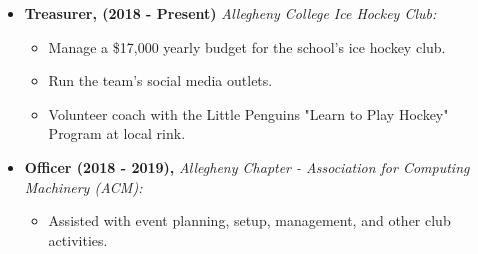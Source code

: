 \documentclass[11pt,a4paper,sans]{moderncv}
\begin{document}
\begin{itemize} %
\item \textbf{Treasurer, (2018 - Present)} \textit{Allegheny College Ice Hockey Club:}
\begin{itemize} %
  \item Manage a \$17,000 yearly budget for the school's ice hockey club.
  \item Run the team's social media outlets.
  \item Volunteer coach with the Little Penguins "Learn to Play Hockey" Program at local rink.
\end{itemize} %

\vspace{2pt}

\item \textbf{Officer (2018 - 2019),} \textit{Allegheny Chapter - Association for Computing Machinery (ACM): }
\begin{itemize} %
  \item Assisted with event planning, setup, management, and other club activities.
\end{itemize} %
\end{itemize} %
\end{document}
